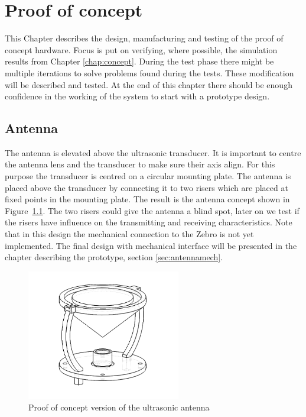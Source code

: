 \chapter{Proof of concept}

This Chapter describes the design, manufacturing and testing of the proof of concept hardware.
Focus is put on verifying, where possible, the simulation results from Chapter \ref{chap:concept}.
During the test phase there might be multiple iterations to solve problems found during the tests.
These modification will be described and tested.
At the end of this chapter there should be enough confidence in the working of the system to start with a prototype design.

\section{Antenna}
\label{sec:antenna_proof}

The antenna is elevated above the ultrasonic transducer. It is important to centre the antenna lens and the transducer to make sure their axis align. For this purpose the transducer is centred on a circular mounting plate. The antenna is placed above the transducer by connecting it to two risers which are placed at fixed points in the mounting plate. The result is the antenna concept shown in Figure~\ref{fig:proto_ant}. The two risers could give the antenna a blind spot, later on we test if the risers have influence on the transmitting and receiving characteristics.
  Note that in this design the mechanical connection to the Zebro is not yet implemented. The final design with mechanical interface will be presented in the chapter describing the prototype, section \ref{sec:antennamech}.

\begin{figure}[H]
\centering
\includegraphics[width=0.6\textwidth]{Figures/proto_ant.PNG}
\caption{Proof of concept version of the ultrasonic antenna}\label{fig:proto_ant}
\end{figure}


